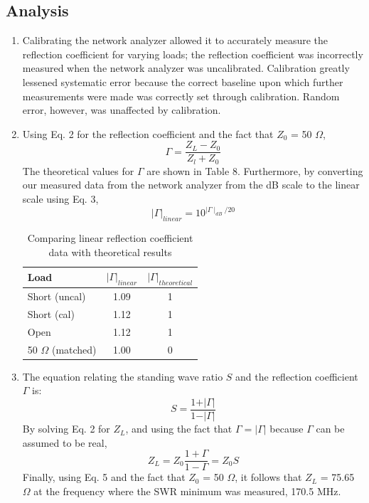 \documentclass{article}
\begin{document}
\subsection{Analysis}
\begin{enumerate}
	\item Calibrating the network analyzer allowed it to accurately measure the reflection coefficient for varying loads; the reflection coefficient was incorrectly measured when the network analyzer was uncalibrated. Calibration greatly lessened systematic error because the correct baseline upon which further measurements were made was correctly set through calibration. Random error, however, was unaffected by calibration.
	
	\item Using Eq. 2 for the reflection coefficient and the fact that $Z_0$ = 50 $\Omega$,
	\begin{equation}
		\Gamma = \frac{Z_L-Z_0}{Z_l+Z_0}
	\end{equation}
	The theoretical values for $\Gamma$ are shown in Table 8. Furthermore, by converting our measured data from the network analyzer from the dB scale to the linear scale using Eq. 3,
	\begin{equation}
		\vert\Gamma\vert_{linear} = 10^{\mid\Gamma\mid_{dB}/20}
	\end{equation}
	
	\begin{table}[H]
	\centering
		\begin{tabular}{|l|c|c|}
		\hline
		\textbf{Load}     & $\vert\Gamma\vert_{linear}$ & $\vert\Gamma\vert_{theoretical}$ \\ \hline
		Short (uncal)         & 1.09      &    1      \\ \hline
		Short (cal)           & 1.12      &    1      \\ \hline
		Open                  & 1.12      &    1      \\ \hline
		50 $\Omega$ (matched) & 1.00  	 &    0      \\ \hline
		\end{tabular}
		\caption{Comparing linear reflection coefficient data with theoretical results}
		\label{}
	\end{table}	

	\item The equation relating the standing wave ratio $S$ and the reflection coefficient $\Gamma$ is:
	\begin{equation} 
		S = \frac{1 + \vert\Gamma\vert}{1 - \vert\Gamma\vert}
	\end{equation}
	By solving Eq. 2 for $Z_L$, and using the fact that $\Gamma = \vert\Gamma\vert$ because $\Gamma$ can be assumed to be real,
	\begin{equation}
		Z_L = Z_0\frac{1 + \Gamma}{1 - \Gamma} = Z_0 S
	\end{equation}	 
	Finally, using Eq. 5 and the fact that $Z_0$ = 50 $\Omega$, it follows that $Z_L$ = 75.65 $\Omega$ at the frequency where the SWR minimum was measured, 170.5 MHz.
\end{enumerate}
\end{document}
